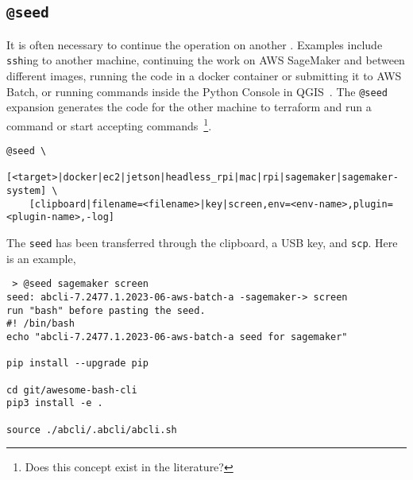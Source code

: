 \subsection{\texttt{@seed}}
\label{seed}

It is often necessary to continue the operation on another . Examples include \texttt{ssh}ing to another machine, continuing the work on AWS SageMaker and between different images, running the code in a docker container or submitting it to AWS Batch, or running commands inside the Python Console in QGIS~. The \texttt{@seed} expansion generates the code for the other machine to terraform and run a command or start accepting commands~\footnote{Does this concept exist in the literature?}.
%
\begin{verbatim}
@seed \
    [<target>|docker|ec2|jetson|headless_rpi|mac|rpi|sagemaker|sagemaker-system] \
    [clipboard|filename=<filename>|key|screen,env=<env-name>,plugin=<plugin-name>,-log]
\end{verbatim}
%
The \texttt{seed} has been transferred through the clipboard, a USB key, and \texttt{scp}. Here is an example,
%
\begin{verbatim}
 > @seed sagemaker screen
seed: abcli-7.2477.1.2023-06-aws-batch-a -sagemaker-> screen
run "bash" before pasting the seed.
#! /bin/bash
echo "abcli-7.2477.1.2023-06-aws-batch-a seed for sagemaker"

pip install --upgrade pip

cd git/awesome-bash-cli
pip3 install -e .

source ./abcli/.abcli/abcli.sh
\end{verbatim}